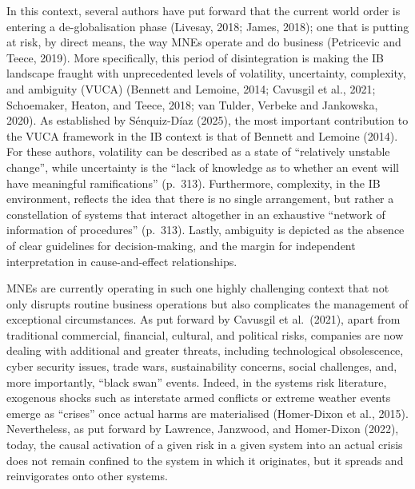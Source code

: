 \documentclass[12pt,a4paper]{article}
\begin{document}
In this context, several authors have put forward that the current world order is entering a de-globalisation phase (Livesay, 2018; James, 2018); one that is putting at risk, by direct means, the way MNEs operate and do business (Petricevic and Teece, 2019). More specifically, this period of disintegration is making the IB landscape fraught with unprecedented levels of volatility, uncertainty, complexity, and ambiguity (VUCA) (Bennett and Lemoine, 2014; Cavusgil et al., 2021; Schoemaker, Heaton, and Teece, 2018; van Tulder, Verbeke and Jankowska, 2020). As established by Sénquiz-Díaz (2025), the most important contribution to the VUCA framework in the IB context is that of Bennett and Lemoine (2014). For these authors, volatility can be described as a state of ``relatively unstable change'', while uncertainty is the ``lack of knowledge as to whether an event will have meaningful ramifications'' (p.\ 313). Furthermore, complexity, in the IB environment, reflects the idea that there is no single arrangement, but rather a constellation of systems that interact altogether in an exhaustive ``network of information of procedures'' (p.\ 313). Lastly, ambiguity is depicted as the absence of clear guidelines for decision-making, and the margin for independent interpretation in cause-and-effect relationships.

MNEs are currently operating in such one highly challenging context that not only disrupts routine business operations but also complicates the management of exceptional circumstances. As put forward by Cavusgil et al.\ (2021), apart from traditional commercial, financial, cultural, and political risks, companies are now dealing with additional and greater threats, including technological obsolescence, cyber security issues, trade wars, sustainability concerns, social challenges, and, more importantly, ``black swan'' events. Indeed, in the systems risk literature, exogenous shocks such as interstate armed conflicts or extreme weather events emerge as ``crises'' once actual harms are materialised (Homer-Dixon et al., 2015). Nevertheless, as put forward by Lawrence, Janzwood, and Homer-Dixon (2022), today, the causal activation of a given risk in a given system into an actual crisis does not remain confined to the system in which it originates, but it spreads and reinvigorates onto other systems.
\end{document}
